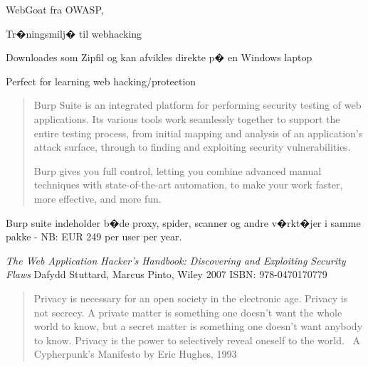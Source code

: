 \documentclass[20pt,landscape,a4paper,footrule]{foils}
\begin{document}


\begin{list1}
\item WebGoat fra OWASP, 
\item Tr�ningsmilj� til webhacking
\item Downloades som Zipfil og kan afvikles direkte p� en Windows laptop
\end{list1}




\centerline{Perfect for learning web hacking/protection}


\begin{quote}
Burp Suite is an integrated platform for performing security testing of web applications. Its various tools work seamlessly together to support the entire testing process, from initial mapping and analysis of an application's attack surface, through to finding and exploiting security vulnerabilities.

Burp gives you full control, letting you combine advanced manual techniques with state-of-the-art automation, to make your work faster, more effective, and more fun.
\end{quote}

Burp suite indeholder b�de proxy, spider, scanner og andre v�rkt�jer i samme pakke - NB: EUR 249 per user per year.





\begin{list1}
\item \emph{The Web Application Hacker's Handbook: Discovering and Exploiting Security Flaws}
Dafydd Stuttard, Marcus Pinto, Wiley 2007 ISBN: 978-0470170779
\end{list1}






\begin{quote}
	Privacy is necessary for an open society in the electronic age. Privacy is not secrecy. A private matter is something one doesn't want the whole world to know, but a secret matter is something one doesn't want anybody to know. Privacy is the power to selectively reveal oneself to the world. ~A Cypherpunk's Manifesto by Eric Hughes, 1993
\end{quote}
\end{document}
